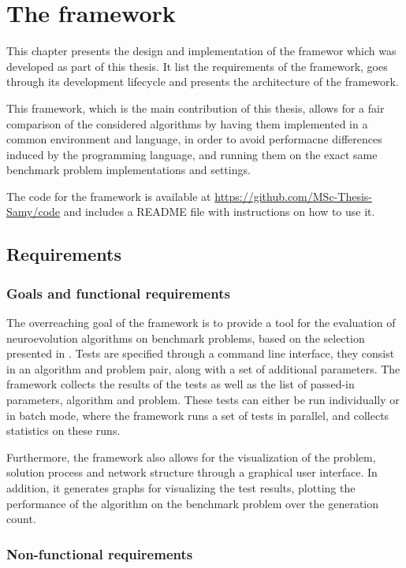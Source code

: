 \chapter{The framework}
\label{chap:framework}

This chapter presents the design and implementation of the framewor which was developed as part of this thesis.
It list the requirements of the framework, goes through its development lifecycle and presents the architecture of the framework.

This framework, which is the main contribution of this thesis, allows for a fair comparison of the considered algorithms by having them implemented in a common environment
and language, in order to avoid performacne differences induced by the programming language, and running them on the exact same benchmark problem implementations and
settings.

The code for the framework is available at \url{https://github.com/MSc-Thesis-Samy/code} and includes a README file with instructions on how to use it.

\section{Requirements}

\subsection{Goals and functional requirements}

The overreaching goal of the framework is to provide a tool for the evaluation of neuroevolution algorithms on benchmark problems, based on the selection
presented in .
Tests are specified through a command line interface, they consist in an algorithm and problem pair, along with a set of additional parameters.
The framework collects the results of the tests as well as the list of passed-in parameters, algorithm and problem.
These tests can either be run individually or in batch mode, where the framework runs a set of tests in parallel, and collects statistics on these runs.

Furthermore, the framework also allows for the visualization of the problem, solution process and network structure through a graphical user interface.
In addition, it generates graphs for visualizing the test results, plotting the performance of the algorithm on the benchmark problem over the generation count.

\subsection{Non-functional requirements}

